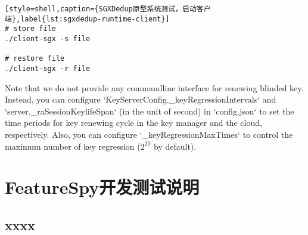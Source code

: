 \begin{lstlisting}[style=shell,caption={SGXDedup原型系统测试，启动客户端},label{lst:sgxdedup-runtime-client}]
# store file
./client-sgx -s file

# restore file
./client-sgx -r file
\end{lstlisting}

Note that we do not provide any commandline interface for renewing blinded key. Instead, you can configure `KeyServerConfig.\_keyRegressionIntervals` and `server.\_raSessionKeylifeSpan` (in the unit of second) in `config.json` to set the time periods for key renewing cycle in the key manager and the cloud, respectively. Also, you can configure `\_keyRegressionMaxTimes` to control the maximum number of key regression ($2^20$ by default).

\chapter{FeatureSpy开发测试说明}
\section{xxxx}